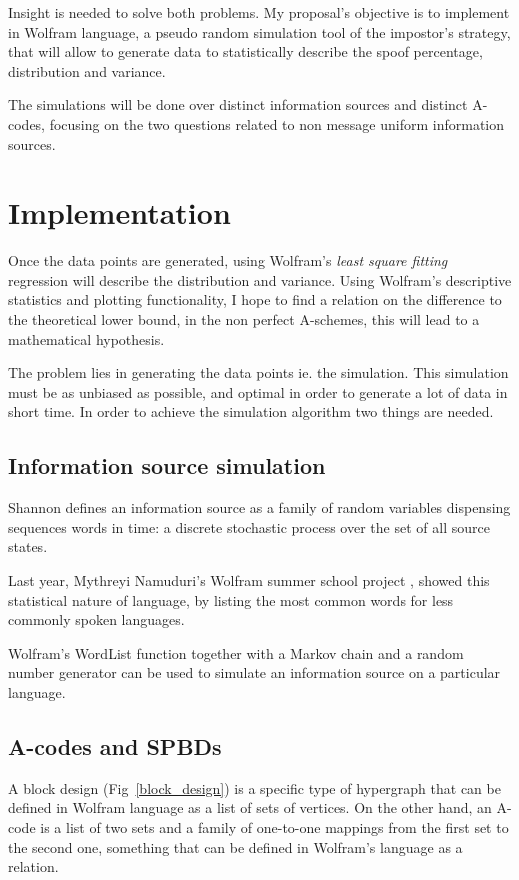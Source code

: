 \documentclass[conference]{IEEEtran}
\begin{document}
Insight is needed to solve both problems. My proposal's objective is to implement in Wolfram language, a pseudo random simulation tool of the impostor's strategy, that will allow to generate data to statistically describe the spoof percentage, distribution and variance.

The simulations will be done over distinct information sources and distinct A-codes, focusing on the two questions related to non message uniform information sources.

%
%
\section{Implementation}
Once the data points are generated, using Wolfram's \textit{least square fitting} regression will describe the distribution and variance. Using Wolfram's descriptive statistics and plotting functionality, I hope to find a relation on the difference to the theoretical lower bound, in the non perfect A-schemes, this will lead to a mathematical hypothesis.

The problem lies in generating the data points ie. the simulation. This simulation must be as unbiased as possible, and optimal in order to generate a lot of data in short time. In order to achieve the simulation algorithm two things are needed.

\subsection{Information source simulation}
Shannon defines an information source as a family of random variables dispensing sequences words in time: a discrete stochastic process over the set of all source states.

Last year, Mythreyi Namuduri's Wolfram summer school project \cite{b5}, showed this statistical nature of language, by listing the most common words for less commonly spoken languages.

Wolfram's WordList function together with a Markov chain and a random number generator can be used to simulate an information source on a particular language.

\subsection{A-codes and SPBDs}
A block design (Fig~\ref{block_design}) is a specific type of hypergraph that can be defined in Wolfram language as a list of sets of vertices. On the other hand, an A-code is a list of two sets and a family of one-to-one mappings from the first set to the second one, something that can be defined in Wolfram's language as a relation.
\end{document}
